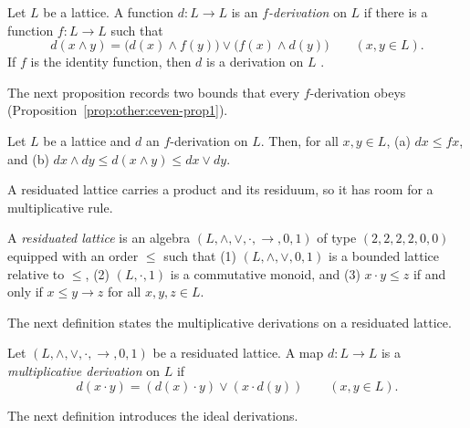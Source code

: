 \begin{definition}\label{def:other:f-derivation}
Let $L$ be a lattice. A function $d \colon L \to L$ is an
\emph{$f$-derivation} on $L$ if there is a function $f \colon L \to L$
such that
\[
d(x \wedge y) = \bigl(d(x) \wedge f(y)\bigr) \vee \bigl(f(x) \wedge d(y)\bigr)
\qquad (x, y \in L).
\]
If $f$ is the identity function, then $d$ is a derivation on $L$
\cite[p.~702]{CevenOzturk2008}.
\end{definition}

The next proposition records two bounds that every $f$-derivation obeys
(Proposition~\ref{prop:other:ceven-prop1}).

\begin{proposition}\label{prop:other:ceven-prop1}
Let $L$ be a lattice and $d$ an $f$-derivation on $L$. Then, for all
$x, y \in L$, \textup{(a)} $dx \le fx$, and \textup{(b)}
$dx \wedge dy \le d(x \wedge y) \le dx \vee dy$.
\end{proposition}

A residuated lattice carries a product and its residuum, so it has room
for a multiplicative rule.

\begin{definition}\label{def:other:residuated-lattice}
A \emph{residuated lattice} is an algebra
$(L, \wedge, \vee, \cdot, \to, 0, 1)$ of type $(2, 2, 2, 2, 0, 0)$
equipped with an order $\le$ such that \textup{(1)}
$(L, \wedge, \vee, 0, 1)$ is a bounded lattice relative to $\le$,
\textup{(2)} $(L, \cdot, 1)$ is a commutative monoid, and \textup{(3)}
$x \cdot y \le z$ if and only if $x \le y \to z$ for all $x, y, z \in L$.
\end{definition}

The next definition states the multiplicative derivations on a residuated
lattice.

\begin{definition}\label{def:other:multiplicative-derivation}
Let $(L, \wedge, \vee, \cdot, \to, 0, 1)$ be a residuated lattice. A map
$d \colon L \to L$ is a \emph{multiplicative derivation} on $L$ if
\[
d(x \cdot y) = (d(x) \cdot y) \vee (x \cdot d(y))
\qquad (x, y \in L).
\]
\end{definition}

The next definition introduces the ideal derivations.

